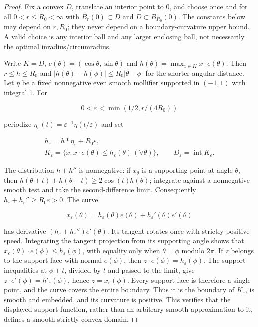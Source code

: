 \documentclass[11pt]{article}
\theoremstyle{definition}
\theoremstyle{remark}
\numberwithin{equation}{section}
\begin{document}
\begin{proof}
Fix a convex $D$, translate an interior point to 0, and choose once and for all $0<r\le R_0<\infty$ with $B_r(0)\subset D$ and $\overline D\subset\overline B_{R_0}(0)$. The constants below may depend on $r,R_0$; they never depend on a boundary-curvature upper bound. A valid choice is any interior ball and any larger enclosing ball, not necessarily the optimal inradius/circumradius.

Write $K=\overline D$, $e(\theta)=(\cos\theta,\sin\theta)$ and $h(\theta)=\max_{x\in K}x\cdot e(\theta)$. Then $r\le h\le R_0$ and $|h(\theta)-h(\phi)|\le R_0|\theta-\phi|$ for the shorter angular distance. Let $\eta$ be a fixed nonnegative even smooth mollifier supported in $(-1,1)$ with integral 1. For

\begin{equation}\label{eq:src-1-01}
0<\varepsilon<\min(1/2,r/(4R_0))
\end{equation}

periodize $\eta_\varepsilon(t)=\varepsilon^{-1}\eta(t/\varepsilon)$ and set

\begin{equation}\label{eq:src-1-02}
\begin{gathered}
h_\varepsilon=h*\eta_\varepsilon+R_0\varepsilon,\qquad \\
K_\varepsilon=\{x:x\cdot e(\theta)\le h_\varepsilon(\theta)\ (\forall\theta)\},\qquad D_\varepsilon=\operatorname{int}K_\varepsilon.
\end{gathered}
\end{equation}

The distribution $h+h''$ is nonnegative: if $x_\theta$ is a supporting point at angle $\theta$, then $h(\theta+t)+h(\theta-t)\ge2\cos(t)h(\theta)$; integrate against a nonnegative smooth test and take the second-difference limit. Consequently $h_\varepsilon+h_\varepsilon''\ge R_0\varepsilon>0$. The curve

\begin{equation}\label{eq:src-1-03}
x_\varepsilon(\theta)=h_\varepsilon(\theta)e(\theta)+h_\varepsilon'(\theta)e'(\theta)
\end{equation}

has derivative $(h_\varepsilon+h_\varepsilon'')e'(\theta)$. Its tangent rotates once with strictly positive speed. Integrating the tangent projection from its supporting angle shows that $x_\varepsilon(\theta)\cdot e(\phi)\le h_\varepsilon(\phi)$, with equality only when $\theta=\phi$ modulo $2\pi$. If $z$ belongs to the support face with normal $e(\phi)$, then $z\cdot e(\phi)=h_\varepsilon(\phi)$. The support inequalities at $\phi\pm t$, divided by $t$ and passed to the limit, give $z\cdot e'(\phi)=h'_\varepsilon(\phi)$, hence $z=x_\varepsilon(\phi)$. Every support face is therefore a single point, and the curve covers the entire boundary. Thus it is the boundary of $K_\varepsilon$, is smooth and embedded, and its curvature is positive. This verifies that the displayed support function, rather than an arbitrary smooth approximation to it, defines a smooth strictly convex domain.


\end{proof}
\end{document}
